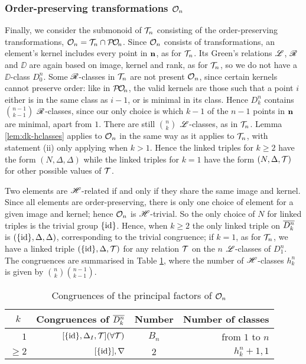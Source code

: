 \subsubsection{Order-preserving transformations $\mathcal{O}_n$}
\label{sec:princfact-on}
Finally, we consider the submonoid of $\mathcal{T}_n$ consisting of the order-preserving
transformations, $\mathcal{O}_n = \mathcal{T}_n \cap \mathcal{P\!O\!}_n$.  Since $\mathcal{O}_n$ consists of
transformations, an element's kernel includes every point in $\mathbf{n}$, as for
$\mathcal{T}_n$.  Its Green's relations $\mathrel{\mathscr{L}}$, $\mathrel{\mathscr{R}}$ and $\DD$ are again based on image,
kernel and rank, as for $\mathcal{T}_n$, so we do not have a $\DD$-class $D_0^n$.  Some
$\mathrel{\mathscr{R}}$-classes in $\mathcal{T}_n$ are not present $\mathcal{O}_n$, since certain kernels cannot
preserve order: like in $\mathcal{P\!O\!}_n$, the valid kernels are those such that a point
$i$ either is in the same class as $i-1$, or is minimal in its class.  Hence
$D_k^n$ contains $\binom{n-1}{k-1}$ $\mathrel{\mathscr{R}}$-classes, since our only choice is
which $k-1$ of the $n-1$ points in $\mathbf{n}$ are minimal, apart from $1$.  There are
still $\binom{n}{k}$ $\mathrel{\mathscr{L}}$-classes, as in $\mathcal{T}_n$.  Lemma \ref{lem:dk-hclasses}
applies to $\mathcal{O}_n$ in the same way as it applies to $\mathcal{T}_n$, with statement (ii)
only applying when $k > 1$.  Hence the linked triples for $k \geq 2$ have the
form $(N, \Delta, \Delta)$ while the linked triples for $k=1$ have the form
$(N, \Delta, \mathcal{T})$ for other possible values of $\mathcal{T}$.

Two elements are $\mathrel{\mathscr{H}}$-related if and only if they share the same image and
kernel.  Since all elements are order-preserving, there is only one choice of
element for a given image and kernel; hence $\mathcal{O}_n$ is $\mathrel{\mathscr{H}}$-trivial.  So the
only choice of $N$ for linked triples is the trivial group $\{\operatorname{id}\}$.  Hence, when
$k \geq 2$ the only linked triple on $\overline{D_k^n}$ is $(\{\operatorname{id}\}, \Delta, \Delta)$,
corresponding to the trivial congruence; if $k = 1$, as for $\mathcal{T}_n$, we have a
linked triple $(\{\operatorname{id}\}, \Delta, \mathcal{T})$ for any relation $\mathcal{T}$ on the $n$ $\mathrel{\mathscr{L}}$-classes
of $D_1^n$.  The congruences are summarised in Table \ref{tab:dkstar-congs-on},
where the number of $\mathrel{\mathscr{H}}$-classes $h_k^n$ is given by
$\binom{n}{k} \binom{n-1}{k-1}$.

\begin{table}[ht]
  \centering
  \renewcommand{\arraystretch}{1.3}
  \begin{tabular}{| r | r | c | r |}
    \hline
    \multicolumn{1}{|c|}{$k$} & \multicolumn{1}{c|}{\textbf{Congruences of $\overline{D_k^n}$}} & \textbf{Number} & \multicolumn{1}{c|}{\textbf{Number of classes}} \\
    \hline
    $1$ & $[\{\operatorname{id}\}, \Delta_I, \mathcal{T}] (\forall \mathcal{T})$ & $B_n$ & from $1$ to $n$ \\
    $\geq 2$
    & $[\{\operatorname{id}\}], \nabla$
    & $2$
    & $h_k^n + 1, 1$ \\
    \hline
  \end{tabular}
  \caption{Congruences of the principal factors of $\mathcal{O}_n$}
  \label{tab:dkstar-congs-on}
\end{table}

